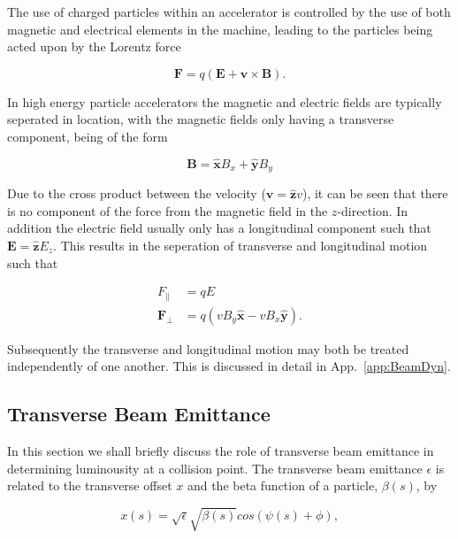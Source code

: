 The use of charged particles within an accelerator is controlled by the use of both magnetic and electrical elements in the machine, leading to the particles being acted upon by the Lorentz force

\begin{equation}
\mathbf{F} = q \left( \mathbf{E} + \mathbf{v} \times \mathbf{B} \right).
\end{equation}

In high energy particle accelerators the magnetic and electric fields are typically seperated in location, with the magnetic fields only having a transverse component, being of the form

\begin{equation}
\mathbf{B} = \mathbf{\hat{x}} B_{x} + \mathbf{\hat{y}} B_{y}
\end{equation}

Due to the cross product between the velocity ($\mathbf{v} = \mathbf{\hat{z}} v$), it can be seen that there is no component of the force from the magnetic field in the $z$-direction. In addition the electric field usually only has a longitudinal component such that $\mathbf{E} = \mathbf{\hat{z}} E_{z}$. This results in the seperation of transverse and longitudinal motion such that

\begin{align}
F_{\parallel} &= qE \\
\mathbf{F_{\perp}} &= q \left( vB_{y} \mathbf{\hat{x}} - vB_{x} \mathbf{\hat{y}} \right).
\end{align}

Subsequently the transverse and longitudinal motion may both be treated independently of one another. This is discussed in detail in App.~\ref{app:BeamDyn}.

\subsection{Transverse Beam Emittance}

In this section we shall briefly discuss the role of transverse beam emittance in determining luminousity at a collision point. The transverse beam emittance $\epsilon$ is related to the transverse offset $x$ and the beta function of a particle, $\beta (s)$, by 

\begin{equation}
x \left( s \right) = \sqrt{\epsilon} \sqrt{\beta \left( s \right) } cos \left( \psi \left( s \right) + \phi \right),
\end{equation}

